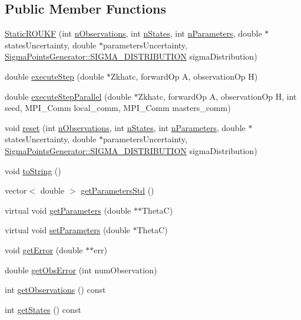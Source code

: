 \subsection*{Public Member Functions}
\begin{DoxyCompactItemize}
\item 
\mbox{\hyperlink{classStaticROUKF_ad16035ac639499eb59aee6b88ca9ca52}{Static\+R\+O\+U\+KF}} (int \mbox{\hyperlink{classStaticROUKF_a3b30dbaa7706106840323888eff5f7b5}{n\+Observations}}, int \mbox{\hyperlink{classStaticROUKF_ad512fa829a858c957c9fa38f45e6b1e0}{n\+States}}, int \mbox{\hyperlink{classStaticROUKF_a2b03763759259e2742eef0221a4218f7}{n\+Parameters}}, double $\ast$states\+Uncertainty, double $\ast$parameters\+Uncertainty, \mbox{\hyperlink{classSigmaPointsGenerator_ad6f9474c0313425a10add120e0acf944}{Sigma\+Points\+Generator\+::\+S\+I\+G\+M\+A\+\_\+\+D\+I\+S\+T\+R\+I\+B\+U\+T\+I\+ON}} sigma\+Distribution)
\item 
double \mbox{\hyperlink{classStaticROUKF_a60e34a2958fa111850d2e74bc85c4f64}{execute\+Step}} (double $\ast$Zkhatc, forward\+Op A, observation\+Op H)
\item 
double \mbox{\hyperlink{classStaticROUKF_a8b0b1ec67cf2f16366c628f775519baf}{execute\+Step\+Parallel}} (double $\ast$Zkhatc, forward\+Op A, observation\+Op H, int seed, M\+P\+I\+\_\+\+Comm local\+\_\+comm, M\+P\+I\+\_\+\+Comm masters\+\_\+comm)
\item 
void \mbox{\hyperlink{classStaticROUKF_a2df76479be92ab63f645eb27184f9a23}{reset}} (int \mbox{\hyperlink{classStaticROUKF_a3b30dbaa7706106840323888eff5f7b5}{n\+Observations}}, int \mbox{\hyperlink{classStaticROUKF_ad512fa829a858c957c9fa38f45e6b1e0}{n\+States}}, int \mbox{\hyperlink{classStaticROUKF_a2b03763759259e2742eef0221a4218f7}{n\+Parameters}}, double $\ast$states\+Uncertainty, double $\ast$parameters\+Uncertainty, \mbox{\hyperlink{classSigmaPointsGenerator_ad6f9474c0313425a10add120e0acf944}{Sigma\+Points\+Generator\+::\+S\+I\+G\+M\+A\+\_\+\+D\+I\+S\+T\+R\+I\+B\+U\+T\+I\+ON}} sigma\+Distribution)
\item 
void \mbox{\hyperlink{classStaticROUKF_a1dda098190863474729ba15728b5943a}{to\+String}} ()
\item 
vector$<$ double $>$ \mbox{\hyperlink{classStaticROUKF_a5000d72faeb9a7f496ab24ae09ead1ab}{get\+Parameters\+Std}} ()
\item 
virtual void \mbox{\hyperlink{classStaticROUKF_ac1acb518b1978a0c07bc9b8c6a1fc36a}{get\+Parameters}} (double $\ast$$\ast$ThetaC)
\item 
virtual void \mbox{\hyperlink{classStaticROUKF_a4588baa8e0022f23b8cd8b43f10dc74a}{set\+Parameters}} (double $\ast$ThetaC)
\item 
void \mbox{\hyperlink{classStaticROUKF_ae51260a2b2792f27ecf3c441ebe532d4}{get\+Error}} (double $\ast$$\ast$err)
\item 
double \mbox{\hyperlink{classStaticROUKF_acf22483dd4fefba60df6f5e7f29429ec}{get\+Obs\+Error}} (int num\+Observation)
\item 
int \mbox{\hyperlink{classStaticROUKF_ae94282d13b307666494ee76aadc58aa4}{get\+Observations}} () const
\item 
int \mbox{\hyperlink{classStaticROUKF_a9896d986a5cb17d1672b3aa8ff5a806d}{get\+States}} () const
\end{DoxyCompactItemize}
